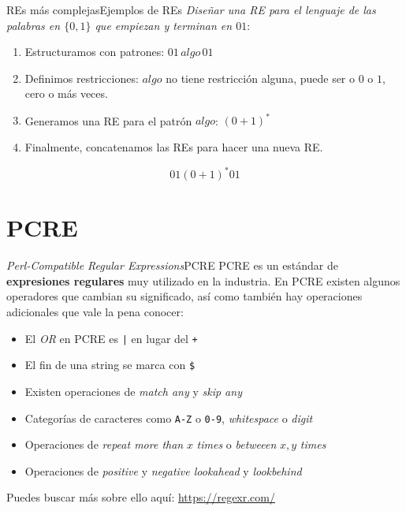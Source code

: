 \documentclass[spanish]{beamer}
\begin{document}
\begin{frame}{REs más complejas}{Ejemplos de REs}
    \textit{Diseñar una RE para el lenguaje de las palabras en $\{0,1\}$ que empiezan y terminan en $01$}: \pause

    \bigskip

    \begin{enumerate}
        \item Estructuramos con patrones:
        $01 \, algo \, 01$ \pause 
        \item Definimos restricciones:
        $algo$ no tiene restricción alguna, puede ser o $0$ o $1$, cero o más veces.\pause
        \item Generamos una RE para el patrón $algo$:
        $(0 + 1)^*$ \pause
        \item Finalmente, concatenamos las REs para hacer una nueva RE.
    \end{enumerate}

    \[01(0+1)^*01\]
\end{frame}

\section{PCRE}

\begin{frame}{\textit{Perl-Compatible Regular Expressions}}{PCRE}
    PCRE es un \alert{estándar} de \textbf{expresiones regulares} muy utilizado en la industria.
    En PCRE existen algunos operadores que cambian su significado, así como también hay operaciones adicionales que vale la pena conocer:

    \bigskip

    \begin{itemize}
        \item El \textit{OR} en PCRE es \texttt{|} en lugar del \texttt{+}
        \item El fin de una string se marca con \texttt{\$}
        \item Existen operaciones de \textit{match any} y \textit{skip any}
        \item Categorías de caracteres como \texttt{A-Z} o \texttt{0-9}, \textit{whitespace} o \textit{digit}
        \item Operaciones de \textit{repeat more than} $x$ \textit{times} o \textit{betweeen} $x, y$ \textit{times}
        \item Operaciones de \textit{positive} y \textit{negative lookahead} y \textit{lookbehind}
    \end{itemize}

    \bigskip

    Puedes buscar más sobre ello aquí: \url{https://regexr.com/}

\end{frame}



% 
% 
\end{document}
